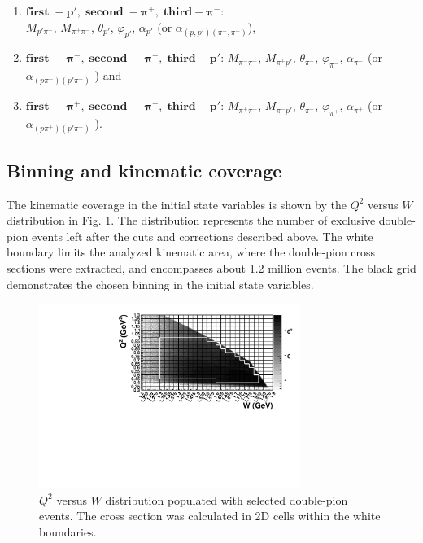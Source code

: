\documentclass[prc,twocolumn,superscriptaddress,showpacs,amssymb,amsmath,amsfonts,aps,nofootinbib]{revtex4-1}
\begin{document}
\begin{enumerate}
\item $\boldsymbol{first\; - p',\; second \; - \pi^{+},\; third - \pi^{-}}$: \\ $M_{p'\pi^{+}}$, $M_{\pi^{+}\pi^{-}}$, $\theta_{p'}$, $\varphi_{p'}$,  $\alpha_{p'}$ (or $\alpha_{(p,p')(\pi^{+},\pi^{-})}$),
\item $\boldsymbol{first\; - \pi^{-},\; second \; - \pi^{+},\; third - p'}$: $M_{\pi^{-}\pi^{+}}$, $M_{\pi^{+}p'}$, $\theta_{\pi^{-}}$, $\varphi_{\pi^{-}}$, $\alpha_{\pi^{-}}$ (or $\alpha_{(p\pi^{-})(p'\pi^{+})}$ ) and
\item $\boldsymbol{first\; - \pi^{+},\; second \; - \pi^{-},\; third - p'}$: $M_{\pi^{+}\pi^{-}}$, $M_{\pi^{-}p'}$, $\theta_{\pi^{+}}$, $\varphi_{\pi^{+}}$, $\alpha_{\pi^{+}}$ (or $\alpha_{(p\pi^{+})(p'\pi^{-})}$ ).
\end{enumerate}







\subsection{Binning and kinematic coverage}

The kinematic coverage in the initial state variables is shown by the $Q^{2}$ versus $W$ distribution in Fig. \ref{fig:q2vsw}. The  distribution represents the number of exclusive double-pion events left after the cuts and corrections described above. 
The white boundary limits the analyzed kinematic area, where the double-pion cross sections were extracted, and encompasses about 1.2 million events. The black grid demonstrates the chosen binning in the initial state variables. 



\begin{figure}[htp]
\begin{center}
 \includegraphics[width=8.5cm,keepaspectratio,trim=0mm 4mm 0mm 0mm,clip]{pictures/binning/q2vsw.pdf} 
\caption{$Q^2$ versus $W$ distribution populated with selected double-pion events. The cross section was calculated in 2D cells within the white boundaries.}
\label{fig:q2vsw}
\end{center}
\end{figure} 
\end{document}
